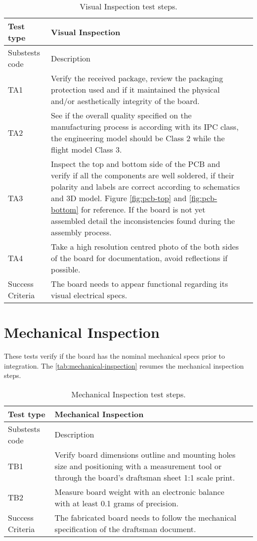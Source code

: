 \begin{table}[!htb]
\centering
\caption{Visual Inspection test steps.}
\label{tab:visual-inspection}
\begin{tabular}{m{3cm} m{12cm} m{3cm}}
\toprule
Test type & Visual Inspection \\
\midrule
\midrule
Substests code & Description \\ 
\midrule
TA1 & Verify the received package, review the packaging protection used and if it maintained the physical and/or aesthetically integrity of the board. \\
\midrule
TA2 & See if the overall quality specified on the manufacturing process is according with its IPC class, the engineering model should be Class 2 while the flight model Class 3. \\
\midrule
TA3 & Inspect the top and bottom side of the PCB and verify if all the components are well soldered, if their polarity and labels are correct according to schematics and 3D model. Figure \ref{fig:pcb-top} and \ref{fig:pcb-bottom} for reference. If the board is not yet assembled detail the inconsistencies found during the assembly process. \\
\midrule
TA4 & Take a high resolution centred photo of the both sides of the board for documentation, avoid reflections if possible. \\
\midrule
\midrule
Success Criteria & The board needs to appear functional regarding its visual electrical specs. \\
\bottomrule
\end{tabular}
\end{table}

\section {Mechanical Inspection}

These tests verify if the board has the nominal mechanical specs prior to integration. 
The \autoref{tab:mechanical-inspection} resumes the mechanical inspection steps. 

\begin{table}[!htb]
\centering
\caption{Mechanical Inspection test steps.}
\label{tab:mechanical-inspection}
\begin{tabular}{m{3cm} m{12cm} m{3cm}}
\toprule
Test type & Mechanical Inspection \\
\midrule
\midrule
Substests code & Description \\ 
\midrule
TB1 & Verify board dimensions outline and mounting holes size and positioning with a measurement tool or through the board's draftsman sheet 1:1 scale print. \\
\midrule
TB2 & Measure board weight with an electronic balance with at least 0.1 grams of precision. \\
\midrule
\midrule
Success Criteria & The fabricated board needs to follow the mechanical specification of the draftsman document. \\
\bottomrule
\end{tabular}
\end{table}

